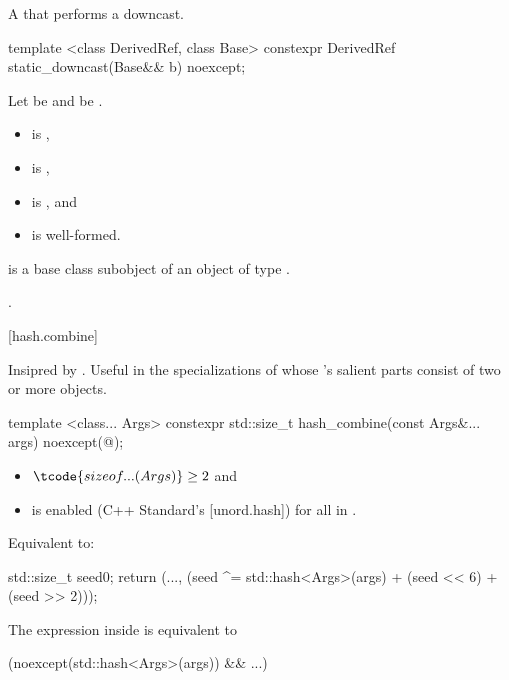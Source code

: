 \pnum
A  that performs a downcast.

%
\begin{itemdecl}
template <class DerivedRef, class Base>
constexpr DerivedRef static_downcast(Base&& b) noexcept;
\end{itemdecl}

\begin{itemdescr}
\pnum
Let  be 
and  be .

\pnum
\constraints
\begin{itemize}
\item
   is ,
\item
   is ,
\item
   is , and
\item
   is well-formed.
\end{itemize}

\pnum
\expects
{} is a base class subobject
of an object of type .

\pnum
\returns
{}.
\end{itemdescr}

[hash.combine]{}

\pnum
Insipred by .
Useful in the specializations of 
whose 's salient parts consist of two or more objects.

%
\begin{itemdecl}
template <class... Args>
constexpr std::size_t hash_combine(const Args&... args) noexcept(@\seebelow@);
\end{itemdecl}

\begin{itemdescr}
\pnum
\constraints
\begin{itemize}
\item
  $\tcode{sizeof...(Args)} \geq 2$ and
\item
   is enabled (C++ Standard's [unord.hash])
  for all  in .
\end{itemize}

\pnum
\effects
Equivalent to:
\begin{codeblock}
std::size_t seed{0};
return (..., (seed ^= std::hash<Args>{}(args) + (seed << 6) + (seed >> 2)));
\end{codeblock}

\pnum
\remarks
The expression inside  is equivalent to
\begin{codeblock}
(noexcept(std::hash<Args>{}(args)) && ...)
\end{codeblock}
\end{itemdescr}
